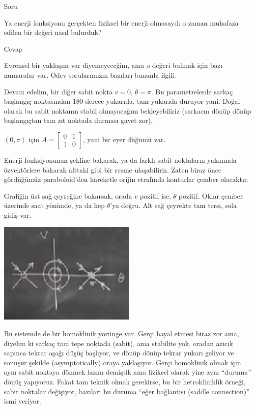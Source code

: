 \documentclass[12pt,fleqn]{article}\usepackage{../../common}
\begin{document}
Soru

Ya enerji fonksiyonu gerçekten fiziksel bir enerji olmasaydı o zaman muhafaza
edilen bir değeri nasıl bulurduk?

Cevap

Evrensel bir yaklaşım var diyemeyeceğim, ama o değeri bulmak için bazı numaralar
var. Ödev sorularımızın bazıları bununla ilgili. 

Devam edelim, bir diğer sabit nokta $v = 0$, $\theta = \pi$. Bu parametrelerde
sarkaç başlangıç noktasından 180 derece yukarıda, tam yukarıda duruyor
yani. Doğal olarak bu sabit noktanın stabil olmayacağını bekleyebiliriz
(sarkacın dönüp dönüp başlangıçtan tam zıt noktada durması gayet zor). 

$(0,\pi)$ için $A = \left[\begin{array}{rr} 0 & 1 \\ 1 &  0\end{array}\right]$, yani
bir eyer düğümü var. 

Enerji fonksiyonunun şekline bakarak, ya da farklı sabit noktaların yakınında
özvektörlere bakarak alttaki gibi bir resme ulaşabiliriz. Zaten biraz önce
gördüğümüz paraboloid'den hareketle orijin etrafında konturlar çember olacaktır.

Grafiğin üst sağ çeyreğine bakarsak, orada $v$ pozitif ise, $\dot{\theta}$
pozitif. Oklar çember üzerinde saat yönünde, ya da hep $\theta$'ya doğru. Alt
sağ çeyrekte tam tersi, sola gidiş var. 

\includegraphics[height=5cm]{07_16.png}

Bu sistemde de bir homoklinik yörünge var. Gerçi hayal etmesi biraz zor ama,
diyelim ki sarkaç tam tepe noktada (sabit), ama stabilite yok, oradan azıcık
sapınca tekrar aşağı düşüş başlıyor, ve dönüp dönüp tekrar yukarı geliyor ve
sonuşur şekilde (asymptotically) oraya yaklaşıyor. Gerçi homoklinik olmak için
aynı sabit noktaya dönmek lazım demiştik ama fiziksel olarak yine aynı
``duruma'' dönüş yapıyoruz. Fakat tam teknik olmak gerekirse, bu bir
hetrokliniklik örneği, sabit noktalar değişiyor, bazıları bu duruma ``eğer
bağlantısı (saddle connection)'' ismi veriyor.
\end{document}
